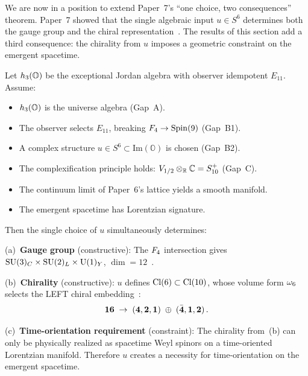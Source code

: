 We are now in a position to extend Paper~7's
``one choice, two consequences'' theorem.  Paper~7 showed that the
single algebraic input $u\in S^6$ determines both the gauge group
and the chiral representation~\cite{Paper7}.
The results of this section add a third consequence: the chirality
from $u$ imposes a geometric constraint on the emergent spacetime.

\begin{theorem}
\label{thm:three-consequence}
Let $h_3(\mathbb{O})$ be the exceptional Jordan algebra with observer
idempotent $E_{11}$.  Assume:
\begin{itemize}
  \item[\textup{(P1)}] $h_3(\mathbb{O})$ is the universe algebra
    \textup{(Gap~A)}.
  \item[\textup{(P2)}] The observer selects $E_{11}$, breaking
    $F_4\to\mathrm{Spin}(9)$ \textup{(Gap~B1)}.
  \item[\textup{(P3)}] A complex structure $u\in S^6 \subset
    \mathrm{Im}(\mathbb{O})$ is chosen \textup{(Gap~B2)}.
  \item[\textup{(P4)}] The complexification principle holds:
    $V_{1/2}\otimes_{\mathbb{R}}\mathbb{C} = S_{10}^+$
    \textup{(Gap~C)}.
  \item[\textup{(A6)}] The continuum limit of Paper~6's lattice
    yields a smooth manifold.
  \item[\textup{(A7)}] The emergent spacetime has Lorentzian
    signature.
\end{itemize}
Then the single choice of $u$ simultaneously determines:

\medskip\noindent
\textup{(a)~\textbf{Gauge group}} \textup{(constructive):}\enspace
The $F_4$ intersection gives $\mathrm{SU}(3)_C \times \mathrm{SU}(2)_L \times \mathrm{U}(1)_Y$,
$\dim = 12$~\cite{Paper7,TodorovDrenska2018}.

\medskip\noindent
\textup{(b)~\textbf{Chirality}} \textup{(constructive):}\enspace
$u$ defines $\mathrm{Cl}(6)\subset\mathrm{Cl}(10)$, whose volume form $\omega_6$
selects the LEFT chiral embedding~\cite{Paper7,Furey2018}:
\begin{equation}\label{eq:chiral-decomp}
  \mathbf{16}
  \;\to\;
  (\mathbf{4},\mathbf{2},\mathbf{1})
  \;\oplus\;
  (\bar{\mathbf{4}},\mathbf{1},\mathbf{2})\,.
\end{equation}

\medskip\noindent
\textup{(c)~\textbf{Time-orientation requirement}}
\textup{(constraint):}\enspace
The chirality from~\textup{(b)} can only be physically realized as
spacetime Weyl spinors on a time-oriented Lorentzian manifold.
Therefore $u$ creates a necessity for time-orientation on the
emergent spacetime.
\end{theorem}

